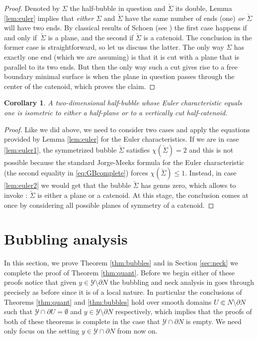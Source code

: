 \documentclass[JEP,XML,SOM,Unicode]{cedram}
\let\mathcal\mathscr
\newcounter{cas}
\newtheorem{cor}[thm]{Corollary}
\theoremstyle{definition}
\let\cemb\Subset
\begin{document}
\begin{proof}
Denoted by $\Sigma$ the half-bubble in question and $\check{\Sigma}$ its double, Lemma \ref{lem:euler} implies that \emph{either} $\Sigma$ and $\check{\Sigma}$ have the same number of ends (one) \emph{or} $\check{\Sigma}$ will have two ends. By classical results of Schoen (see \cite{Sc83}) the first case happens if and only if~$\check{\Sigma}$ is a plane, and the second if $\check{\Sigma}$ is a catenoid. The conclusion in the former case is straightforward, so let us discuss the latter. The only way $\Sigma$ has exactly one end (which we are assuming) is that it is cut with a plane that is parallel to its two ends. But then the only way such a cut gives rise to a free boundary minimal surface is when the plane in question passes through the center of the catenoid, which proves the claim.
\end{proof}

\begin{cor}\label{cor:genuszero}
A two-dimensional half-bubble whose Euler characteristic equals one is isometric to either a half-plane or to a vertically cut half-catenoid.
\end{cor}

\begin{proof}
Like we did above, we need to consider two cases and apply the equations provided by Lemma \ref{lem:euler} for the Euler characteristics. If we are in case \eqref{lem:euler1}, the symmetrized bubble $\check{\Sigma}$ satisfies $\chi(\check{\Sigma})=2$ and this is not possible because the standard Jorge-Meeks formula for the Euler characteristic (\cf the second equality in \eqref{eq:GBcomplete}) forces $\chi(\check{\Sigma})\leq 1$.
Instead, in case \eqref{lem:euler2} we would get that the bubble $\check{\Sigma}$ has genus zero, which allows to invoke \cite{LR91}: $\check{\Sigma}$ is either a plane or a catenoid. At this stage, the conclusion comes at once by considering all possible planes of symmetry of a catenoid.
\end{proof}
\enlargethispage{-\baselineskip}%

\section{Bubbling analysis}\label{sec:bubbling}

In this section, we prove Theorem \ref{thm:bubbles} and in Section \ref{sec:neck} we complete the proof of Theorem \ref{thm:quant}. Before we begin either of these proofs notice that given $y\in \mathcal{Y}\setminus \partial N$ the bubbling and neck analysis in \cite{BS17} goes through precisely as before since it is of a local nature. In particular the conclusions of Theorems \ref{thm:quant} and \ref{thm:bubbles} hold over smooth domains $U\cemb N\setminus\partial N$ such that $\mathcal{Y}\cap \partial U =\emptyset$ and $y\in \mathcal{Y}\setminus \partial N$ respectively, which implies that the proofs of both of these theorems is complete in the case that $\mathcal{Y}\cap \partial N$ is empty. We need only focus on the setting $y\in \mathcal{Y}\cap \partial N$ from now on.
\end{document}
